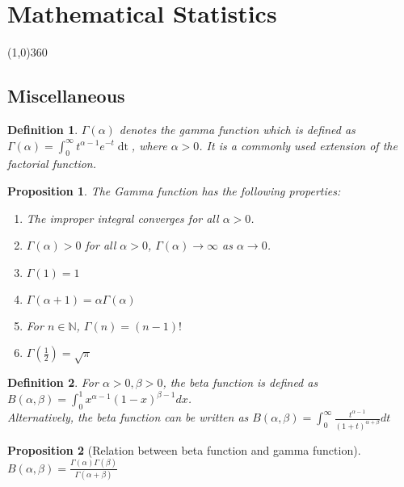 \documentclass[14pt,twoside]{extreport}
\theoremstyle{dotless}
\newtheorem*{defn}{\footnotesize Definition}
\newtheorem*{prop}{\footnotesize Proposition} %
\begin{document}
\newpage
{}

\chapter*{Mathematical Statistics}
\line(1,0){360} \\

\section*{Miscellaneous}

\begin{defn}
    $\Gamma(\alpha)$ denotes the gamma function which is defined as $\Gamma(\alpha) = \displaystyle\int_0^\infty t ^{\alpha - 1} e ^{-t} \mathop{\mathrm{d} t}$, where $\alpha > 0$. It is a commonly used extension of the factorial function.
\end{defn}

\begin{prop}
    The Gamma function has the following properties:
    \begin{enumerate}
        \item The improper integral converges for all $\alpha > 0$.
        \item $\Gamma(\alpha) > 0$  for all $\alpha > 0$, $\Gamma(\alpha) \to \infty$ as $\alpha \to 0$.
        \item $\Gamma(1) = 1$
        \item $\Gamma(\alpha + 1) = \alpha \Gamma(\alpha)$
        \item For $n \in \mathbb{N}$, $\Gamma(n) = (n-1)!$
        \item $\Gamma(\frac{1}{2}) = \sqrt{\pi}$
    \end{enumerate}
\end{prop}

\begin{defn}
    For $\alpha > 0, \beta > 0$, the beta function is defined as $B(\alpha, \beta) = \displaystyle\int_0^1 x^{\alpha -1} (1-x)^{\beta - 1} dx$.
    \\

    Alternatively, the beta function can be written as $B(\alpha, \beta) = \displaystyle\int_0^\infty \frac{t^{\alpha - 1}}{(1+t)^{\alpha + \beta}} dt$
\end{defn}

\begin{prop}[Relation between beta function and gamma function]\ \\
    $B(\alpha, \beta) = \displaystyle\frac{\Gamma(\alpha)\Gamma(\beta)}{\Gamma(\alpha + \beta)}$
\end{prop}
\end{document}
